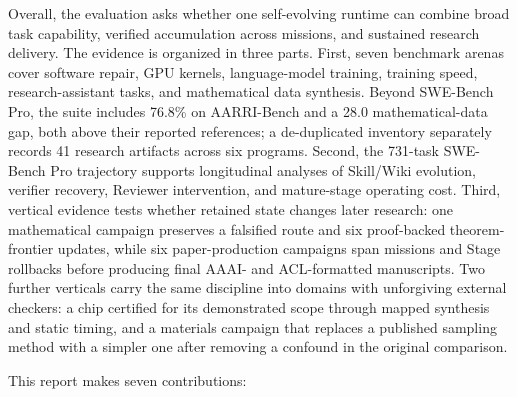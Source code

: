 Overall, the evaluation asks whether one self-evolving runtime can combine broad
task capability, verified accumulation across missions, and sustained research
delivery. The evidence is organized in three parts. First, seven benchmark arenas
cover software repair, GPU kernels, language-model training, training speed,
research-assistant tasks, and mathematical data synthesis. Beyond SWE-Bench Pro,
the suite includes 76.8\% on AARRI-Bench and a 28.0 mathematical-data gap, both above
their reported references; a de-duplicated inventory separately records 41 research
artifacts across six programs. Second, the 731-task SWE-Bench Pro trajectory supports
longitudinal analyses of Skill/Wiki evolution, verifier recovery, Reviewer
intervention, and mature-stage operating cost. Third, vertical evidence tests whether
retained state changes later research: one mathematical campaign preserves a
falsified route and six proof-backed theorem-frontier updates, while six
paper-production campaigns span \PaperCaseMissions{} missions and
\PaperCaseRollbacks{} Stage rollbacks before producing final AAAI- and ACL-formatted
manuscripts. Two further verticals carry the same discipline into domains with
unforgiving external checkers: a chip certified for its demonstrated scope through
mapped synthesis and static timing, and a materials campaign that replaces a
published sampling method with a simpler one after removing a confound in the
original comparison.

This report makes seven contributions:

